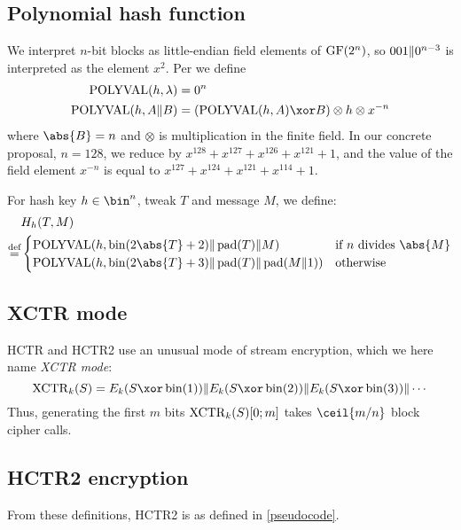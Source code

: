 \documentclass[hctr.tex]{subfiles}
\begin{document}
\subsection{Polynomial hash function}\label{hashspec}
We interpret \(n\)-bit blocks as little-endian field elements of \(\operatorname{GF}(2^n)\),
so \(001 \Vert 0^{n-3}\) is interpreted as the element \(x^2\).
Per \cite{aes_gcm_siv,aes_gcm_siv_rfc} we define
\begin{align*}
    \POLYVAL(h, \lambda) & = 0^n\\
    \POLYVAL(h, A \Concat B) & = (\POLYVAL(h, A) \xor B) \otimes h \otimes x^{-n}
\end{align*}
where \(\abs{B} = n\) and
\(\otimes\) is multiplication in the finite field.
In our concrete proposal, \(n=128\), we reduce by
\(x^{128} + x^{127} + x^{126} + x^{121} + 1\),
and the value of the field element \(x^{-n}\)
is equal to \(x^{127} + x^{124} + x^{121} + x^{114} + 1\).

For hash key \(h \in \bin^n\), tweak \(T\) and message \(M\), we define:
\begin{align*}
    & H_h(T, M) \\
    \defeq & 
    \begin{cases}
        \POLYVAL(h, \fromint(2\abs{T} + 2) \Concat \pad(T) \Concat M) &
        \text{if } n \text{ divides } \abs{M} \\
        \POLYVAL(h, \fromint(2\abs{T} + 3) \Concat \pad(T) \Concat \pad(M \Concat 1)) &
        \text{otherwise}
    \end{cases}
\end{align*}

\subsection{XCTR mode}
HCTR and HCTR2 use an unusual mode of stream encryption,
which we here name \emph{XCTR mode}:
\begin{displaymath}
    \XCTR_k(S) = E_k(S \xor \fromint(1)) \Concat E_k(S \xor \fromint(2)) \Concat E_k(S \xor \fromint(3)) \Concat \cdots
\end{displaymath}
Thus, generating the first \(m\) bits \(\operatorname{XCTR}_k(S)[0; m]\) takes \(\ceil{m/n}\) block cipher calls. 

\subsection{HCTR2 encryption}
From these definitions, HCTR2 is as defined in \autoref{pseudocode}.

\end{document}
